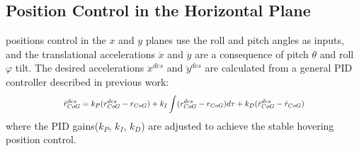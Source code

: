 \subsection{Position Control in the Horizontal Plane}
positions control in the $x$ and $y$ planes use the roll and pitch angles as inputs, and the translational accelerations $\ddot{x}$ and $\ddot{y}$ are a consequence of pitch $\theta$ and roll $\varphi$ tilt. The desired accelerations $\ddot{x}^{des}$ and $\ddot{y}^{des}$ are calculated from a general PID controller described in previous work\cite{Zhao2014}:
\begin{equation}
  \scalebox{0.8}{$\displaystyle
  \ddot{r}^{des}_{CoG}=k_P(r^{des}_{CoG}-r_{CoG})+k_I\int(r^{des}_{CoG}-r_{CoG})d\tau+k_D(\dot{r}^{des}_{CoG}-\dot{r}_{CoG})$}
\end{equation}
where the PID gains($k_P$, $k_I$, $k_D$) are adjusted to achieve the stable hovering position control.
